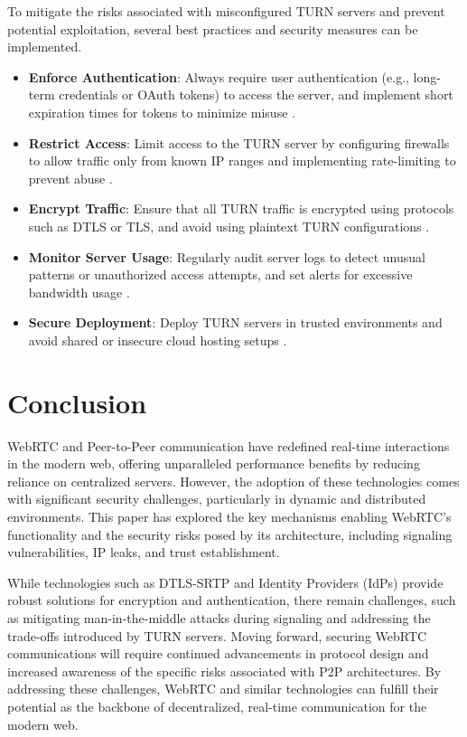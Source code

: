 \documentclass[conference]{IEEEtran}
\begin{document}
To mitigate the risks associated with misconfigured TURN servers and prevent potential exploitation, several best practices and security measures can be implemented.
\begin{itemize}
    \item \textbf{Enforce Authentication}: Always require user authentication (e.g., long-term credentials or OAuth tokens) to access the server, 
    and implement short expiration times for tokens to minimize misuse \cite{security_of_WebRTC}.
    \item \textbf{Restrict Access}: Limit access to the TURN server by configuring firewalls to allow traffic only from known IP ranges and implementing
     rate-limiting to prevent abuse \cite{security_of_WebRTC}.
    \item \textbf{Encrypt Traffic}: Ensure that all TURN traffic is encrypted using protocols such as DTLS or TLS, and avoid using plaintext TURN 
    configurations \cite{security_of_WebRTC}.
    \item \textbf{Monitor Server Usage}: Regularly audit server logs to detect unusual patterns or unauthorized access attempts, and set alerts for 
    excessive bandwidth usage \cite{security_of_WebRTC}.
    \item \textbf{Secure Deployment}: Deploy TURN servers in trusted environments and avoid shared or insecure cloud hosting setups \cite{security_of_WebRTC}.
\end{itemize}

\section{Conclusion}

WebRTC and Peer-to-Peer communication have redefined real-time interactions in the modern web, offering unparalleled performance 
benefits by reducing reliance on centralized servers. However, the adoption of these technologies comes with significant security 
challenges, particularly in dynamic and distributed environments. This paper has explored the key mechanisms enabling WebRTC's 
functionality and the security risks posed by its architecture, including signaling vulnerabilities, IP leaks, and trust establishment.

While technologies such as DTLS-SRTP and Identity Providers (IdPs) provide robust solutions for encryption and authentication, 
there remain challenges, such as mitigating man-in-the-middle attacks during signaling and addressing the trade-offs introduced 
by TURN servers. Moving forward, securing WebRTC communications will require continued advancements in protocol design and increased 
awareness of the specific risks associated with P2P architectures. By addressing these challenges, WebRTC and similar technologies can 
fulfill their potential as the backbone of decentralized, real-time communication for the modern web.

\printbibliography{}
\end{document}
